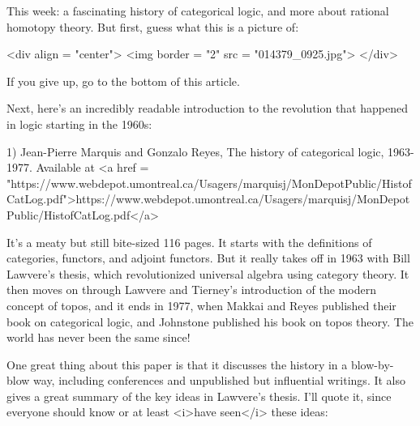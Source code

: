 

This week: a fascinating history of categorical logic, and more about
rational homotopy theory.  But first, guess what this is a picture of:

<div align = "center">
<img border = "2" src = "014379_0925.jpg">
</div>

If you give up, go to the bottom of this article.

Next, here's an incredibly readable introduction to the revolution
that happened in logic starting in the 1960s:

1) Jean-Pierre Marquis and Gonzalo Reyes, The history of categorical
logic, 1963-1977.  Available at
<a href = "https://www.webdepot.umontreal.ca/Usagers/marquisj/MonDepotPublic/HistofCatLog.pdf">https://www.webdepot.umontreal.ca/Usagers/marquisj/MonDepotPublic/HistofCatLog.pdf</a>

It's a meaty but still bite-sized 116 pages.  It starts with the
definitions of categories, functors, and adjoint functors.  But it
really takes off in 1963 with Bill Lawvere's thesis, which
revolutionized universal algebra using category theory.  It then moves
on through Lawvere and Tierney's introduction of the modern concept of
topos, and it ends in 1977, when Makkai and Reyes published their book
on categorical logic, and Johnstone published his book on topos theory.
The world has never been the same since!

One great thing about this paper is that it discusses the history in a
blow-by-blow way, including conferences and unpublished but
influential writings.  It also gives a great summary of the key ideas
in Lawvere's thesis.  I'll quote it, since everyone should know or at
least <i>have seen</i> these ideas:

